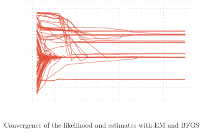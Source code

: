 \begin{figure}[htb]
{\begin{subfigure}[t]{0.5\textwidth+0.4in}
    \end{subfigure}%
    \begin{subfigure}[t]{0.5\textwidth+0.4in}%
		\includegraphics{img/harmonic_bf_lqx}%
    \end{subfigure}}%
    \caption{Convergence of the likelihood and estimates with EM and BFGS}\label{fig:harmonic_est}
 \end{figure}

